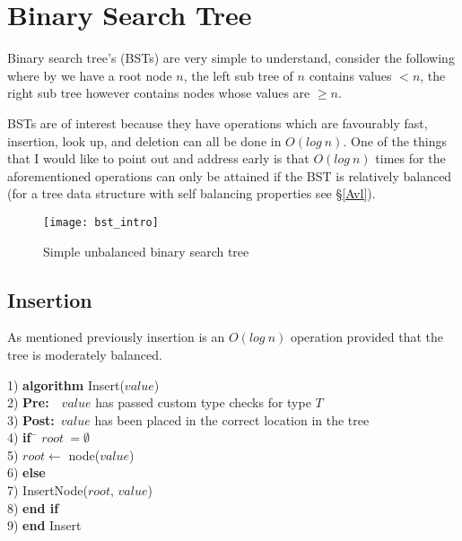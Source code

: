 \chapter{Binary Search Tree} \label{bst}
Binary search tree's (BSTs) are very simple to understand, consider the following where by we have a root node $n$, the left sub tree of $n$ contains values $< n$, the right sub tree however contains nodes whose values are $\geq n$.

BSTs are of interest because they have operations which are favourably fast, insertion, look up, and deletion can all be done in $O(log~n)$. One of the things that I would like to point out and address early is that $O(log~n)$ times for the aforementioned operations can only be attained if the BST is relatively balanced (for a tree data structure with self balancing properties see \S\ref{Avl}). 

\begin{figure}[htp]
\begin{center}
\texttt{[image: bst\_intro]}
\end{center}
\caption{Simple unbalanced binary search tree} \label{fig:bst_intro}
\end{figure}

\newpage
\section{Insertion}
As mentioned previously insertion is an $O(log~n)$ operation provided that the tree is moderately balanced.

\begin{tabbing}
1)  \textbf{alg}\= \textbf{orithm} Insert($value$) \\
2)  \> \textbf{Pre:}~~$value$ has passed custom type checks for type $T$ \\
3)  \> \textbf{Post:}~$value$ has been placed in the correct location in the tree \\
4)  \> \textbf{if}~\= $root~= \emptyset$ \\
5)  \> \> $root \leftarrow$ node($value$) \\
6)  \> \textbf{else} \\
7)  \> \> InsertNode($root$, $value$) \\
8)  \> \textbf{end if} \\
9)  \textbf{end} Insert \\
\end{tabbing}


